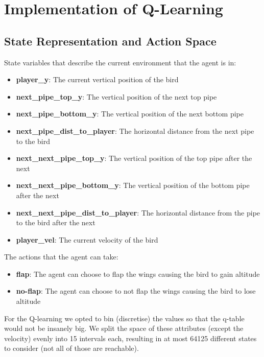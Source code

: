 \documentclass[a4paper,12pt]{article}
\begin{document}
\section{Implementation of Q-Learning}
\subsection{State Representation and Action Space}

\noindent State variables that describe the current environment that the agent is in:
\begin{itemize}
    \item \textbf{player\_y}: The current vertical position of the bird
    \item \textbf{next\_pipe\_top\_y}: The vertical position of the next top pipe
    \item \textbf{next\_pipe\_bottom\_y}: The vertical position of the next bottom pipe
    \item \textbf{next\_pipe\_dist\_to\_player}: The horizontal distance from the next pipe to the bird
    \item \textbf{next\_next\_pipe\_top\_y}: The vertical position of the top pipe after the next
    \item \textbf{next\_next\_pipe\_bottom\_y}: The vertical position of the bottom pipe after the next
    \item \textbf{next\_next\_pipe\_dist\_to\_player}: The horizontal distance from the pipe to the bird after the next
    \item \textbf{player\_vel}: The current velocity of the bird
\end{itemize}

\noindent The actions that the agent can take:
\begin{itemize}
    \item \textbf{flap}: The agent can choose to flap the wings causing the bird to gain altitude
    \item \textbf{no-flap}: The agent can choose to not flap the wings causing the bird to lose altitude
\end{itemize}

\noindent For the Q-learning we opted to bin (discretise) the values so that the q-table would not be insanely big. We split the space of these attributes (except the velocity) evenly
into 15 intervals each, resulting in at most 64125 different states to consider (not all of those are reachable).
\end{document}
